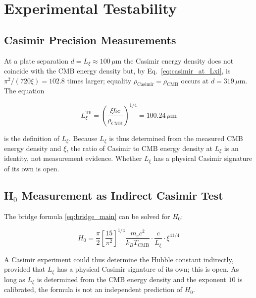 \section{Experimental Testability}
\label{sec:predictions}

\subsection{Casimir Precision Measurements}

At a plate separation $d = L_\xi \approx 100\,\mu\text{m}$ the Casimir energy density
does not coincide with the CMB energy density but, by
Eq.~\eqref{eq:casimir_at_Lxi}, is $\pi^2/(720\xi) = 102.8$ times larger; equality
$\rho_\text{Casimir} = \rho_\text{CMB}$ occurs at $d = 319\,\mu$m. The equation

\begin{equation}
    L_\xi^\text{T0}
    = \left(\frac{\xi\hbar c}{\rho_\text{CMB}}\right)^{1/4}
    = 100.24\,\mu\text{m}
    \label{eq:Lxi_prediction}
\end{equation}

is the definition of $L_\xi$. Because $L_\xi$ is thus determined from the measured CMB
energy density and $\xi$, the ratio of Casimir to CMB energy density at $L_\xi$ is an
identity, not measurement evidence. Whether $L_\xi$ has a physical Casimir signature
of its own is open.

\subsection{H\texorpdfstring{$_0$}{0} Measurement as Indirect Casimir Test}

The bridge formula \eqref{eq:bridge_main} can be solved for $H_0$:

\begin{equation}
    H_0 = \frac{\pi}{2}\left[\frac{15}{\pi^2}\right]^{1/4}
          \frac{m_e c^2}{k_B T_\text{CMB}}
          \cdot \frac{c}{L_\xi} \cdot \xi^{41/4}
    \label{eq:H0_from_Casimir}
\end{equation}

A Casimir experiment could thus determine the Hubble constant indirectly,
provided that $L_\xi$ has a physical Casimir signature of its own; this is open.
As long as $L_\xi$ is determined from the CMB energy density and the exponent $10$
is calibrated, the formula is not an independent prediction of $H_0$.

